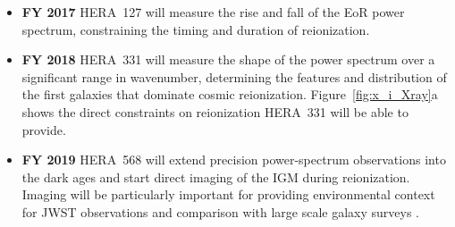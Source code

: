 \documentclass[preprint]{aastex}
\begin{document}

\begin{itemize}\setlength{\parskip}{0pt}\itemsep0pt

\item {\bf FY 2017} HERA~127 will measure the rise and fall of the EoR power
spectrum, constraining the timing and duration of reionization.

\item {\bf FY 2018} HERA~331 will measure the shape of the power spectrum over
a significant range in wavenumber, determining the features and distribution of
the first galaxies that dominate cosmic reionization.
Figure~\ref{fig:x_i_Xray}a shows the direct constraints on reionization
HERA~331 will be able to provide.


\item {\bf FY 2019} HERA~568 will extend precision power-spectrum observations
into the dark ages and start direct imaging of the IGM during reionization.
Imaging will be particularly important for providing environmental context for
JWST observations and comparison with large scale galaxy surveys .
\end{itemize}
\end{document}
